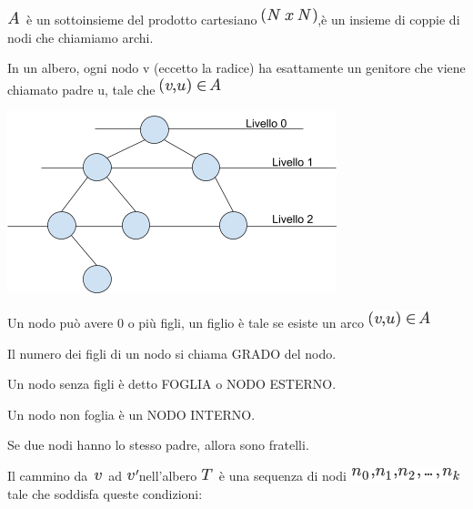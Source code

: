 \documentclass{article}
\begin{document}
\includegraphics{images/image73.png}{~è un sottoinsieme del prodotto
cartesiano }\includegraphics{images/image74.png}{,è un insieme di coppie
di nodi che chiamiamo }{archi}{.}

{}

{}

{In un albero, ogni nodo v (eccetto la radice) ha esattamente un
genitore che viene chiamato padre u, tale che
}\includegraphics{images/image75.png}

{\includegraphics{images/image539.png}}

{}

{Un nodo può avere 0 o più figli, un figlio è tale se esiste un arco
}\includegraphics{images/image75.png}

{}

{Il numero dei figli di un nodo si chiama GRADO del nodo.}

{Un nodo senza figli è detto FOGLIA o NODO ESTERNO.}

{Un nodo non foglia è un NODO INTERNO.}

{Se due nodi hanno lo stesso padre, allora sono fratelli.}

{}

{Il cammino da}{~}\includegraphics{images/image76.png}{~ad
}\includegraphics{images/image77.png}{nell'albero
}\includegraphics{images/image37.png}{~è una sequenza di nodi
}\includegraphics{images/image78.png}{tale che soddisfa queste
condizioni:}
\end{document}
